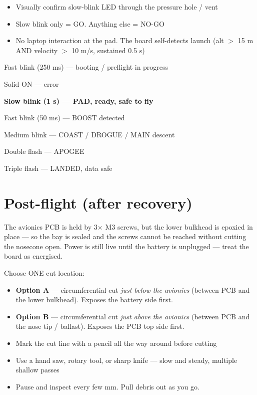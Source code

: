 \documentclass[11pt,a4paper,oneside]{report}
\begin{document}
\begin{itemize}
  \item Visually confirm slow-blink LED through the pressure hole / vent
  \item Slow blink only = GO. Anything else = NO-GO
  \item No laptop interaction at the pad. The board self-detects launch (alt $>$ 15 m AND velocity $>$ 10 m/s, sustained 0.5 s)
\end{itemize}

\begin{plainitem}
  \item Fast blink (250 ms) --- booting / preflight in progress
  \item Solid ON --- error
  \item \textbf{Slow blink (1 s) --- PAD, ready, safe to fly}
  \item Fast blink (50 ms) --- BOOST detected
  \item Medium blink --- COAST / DROGUE / MAIN descent
  \item Double flash --- APOGEE
  \item Triple flash --- LANDED, data safe
\end{plainitem}

\section{Post-flight (after recovery)}

The avionics PCB is held by 3$\times$ M3 screws, but the lower bulkhead is epoxied in place --- so the bay is sealed and the screws cannot be reached without cutting the nosecone open. Power is still live until the battery is unplugged --- treat the board as energised.

Choose ONE cut location:
\begin{itemize}
  \item \textbf{Option A} --- circumferential cut \emph{just below the avionics} (between PCB and the lower bulkhead). Exposes the battery side first.
  \item \textbf{Option B} --- circumferential cut \emph{just above the avionics} (between PCB and the nose tip / ballast). Exposes the PCB top side first.
\end{itemize}

\begin{itemize}
  \item Mark the cut line with a pencil all the way around before cutting
  \item Use a hand saw, rotary tool, or sharp knife --- slow and steady, multiple shallow passes
  \item Pause and inspect every few mm. Pull debris out as you go.
\end{itemize}
\end{document}
